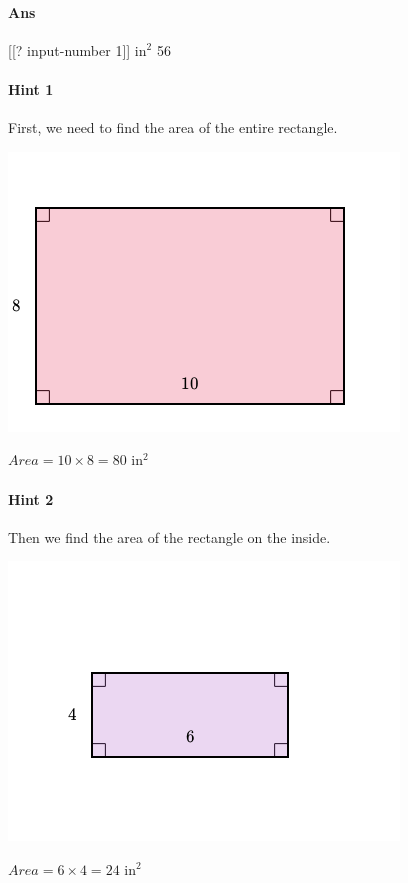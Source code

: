 \documentclass[twocolumn,10pt]{article}
\def\shrinkfactor{0.55}
\begin{document}
\paragraph{Ans}  [[? input-number 1]] $\text{in}^2$  56

\paragraph{Hint 1}First, we need to find the area of the entire rectangle.  


\includegraphics[scale=\shrinkfactor]{figures/840752dfa9d7f16638349beb8996e329917ecac4.png}
 
$Area=10\times8=80  \text{ in}^2$  

\paragraph{Hint 2}Then we find the area of the rectangle on the inside.  


\includegraphics[scale=\shrinkfactor]{figures/a7b048032baf0298ab335931877732a0a2bc0db5.png}  

$Area=6\times4=24  \text{ in}^2$  
\end{document}
